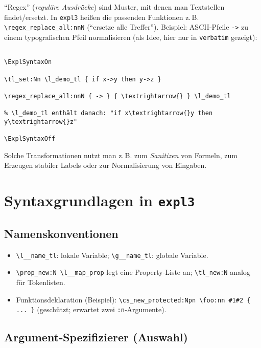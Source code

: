 \documentclass[11pt,a4paper]{book}
\begin{document}
\enquote{Regex} (\emph{reguläre Ausdrücke}) sind Muster, mit denen man Textstellen findet/ersetzt. In \texttt{expl3} heißen die passenden Funktionen z.\,B. \verb|\regex_replace_all:nnN| (\enquote{ersetze alle Treffer}). Beispiel: ASCII‑Pfeile \verb|->| zu einem typografischen Pfeil normalisieren (als Idee, hier nur in \verb|verbatim| gezeigt):

\begin{verbatim}

\ExplSyntaxOn

\tl_set:Nn \l_demo_tl { if x->y then y->z }

\regex_replace_all:nnN { -> } { \textrightarrow{} } \l_demo_tl

% \l_demo_tl enthält danach: "if x\textrightarrow{}y then y\textrightarrow{}z"

\ExplSyntaxOff

\end{verbatim}

Solche Transformationen nutzt man z.\,B. zum \emph{Sanitizen} von Formeln, zum Erzeugen stabiler Labels oder zur Normalisierung von Eingaben.



\chapter{Syntaxgrundlagen in \texttt{expl3}}

\section{Namenskonventionen}

\begin{itemize}

  \item \verb|\l__name_tl|: lokale Variable; \verb|\g__name_tl|: globale Variable.

  \item \verb|\prop_new:N \l__map_prop| legt eine Property‑Liste an; \verb|\tl_new:N| analog für Tokenlisten.

  \item Funktionsdeklaration (Beispiel): \verb|\cs_new_protected:Npn \foo:nn #1#2 { ... }| (geschützt; erwartet zwei \texttt{:n}‑Argumente).

\end{itemize}



\section{Argument‑Spezifizierer (Auswahl)}
\end{document}

